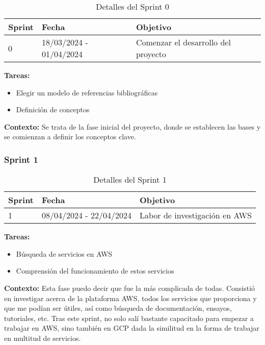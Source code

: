 \begin{table}[h]
	\centering
	\begin{tabularx}
		{\textwidth}{l X X} \toprule \textbf{Sprint} & \textbf{Fecha} & \textbf{Objetivo}
		\\ \midrule 0 & 18/03/2024 - 01/04/2024 & Comenzar el desarrollo del proyecto
		\\ \bottomrule
	\end{tabularx}
	\caption{Detalles del Sprint 0}
	\label{tab:sprint0}
\end{table}

\textbf{Tareas:}
\begin{itemize}
	\item Elegir un modelo de referencias bibliográficas

	\item Definición de conceptos
\end{itemize}

\textbf{Contexto:} Se trata de la fase inicial del proyecto, donde se establecen
las bases y se comienzan a definir los conceptos clave.

\subsubsection{Sprint 1}

\begin{table}[h]
	\centering
	\begin{tabularx}
		{\textwidth}{l X X} \toprule \textbf{Sprint} & \textbf{Fecha} & \textbf{Objetivo}
		\\ \midrule 1 & 08/04/2024 - 22/04/2024 & Labor de investigación en AWS \\ \bottomrule
	\end{tabularx}
	\caption{Detalles del Sprint 1}
	\label{tab:sprint1}
\end{table}

\textbf{Tareas:}
\begin{itemize}
	\item Búsqueda de servicios en AWS

	\item Comprensión del funcionamiento de estos servicios
\end{itemize}

\textbf{Contexto:} Esta fase puedo decir que fue la más complicada de todas. Consistió
en investigar acerca de la plataforma AWS, todos los servicios que proporciona y
que me podían ser útiles, así como búsqueda de documentación, ensayos, tutoriales,
etc. Tras este sprint, no solo salí bastante capacitado para empezar a trabajar
en AWS, sino también en GCP dada la similitud en la forma de trabajar en multitud de servicios.


